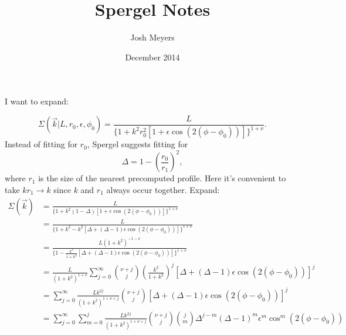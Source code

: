 \documentclass{article}
\title{Spergel Notes}
\author{Josh Meyers}
\date{December 2014}
\begin{document}
I want to expand:

\begin{equation}
  \label{eqn:SBdef}
  \Sigma(\vec{k}|L,r_0,\epsilon,\phi_0) = \frac{L}{\{1+k^2r_0^2[1+\epsilon\cos(2(\phi-\phi_0))]\}^{1+\nu}}.
\end{equation}
Instead of fitting for $r_0$, Spergel suggests fitting for
\begin{equation}
  \Delta = 1 - \left(\frac{r_0}{r_1}\right)^2,
\end{equation}
where $r_1$ is the size of the nearest precomputed profile.  Here it's convenient to take $k r_1 \rightarrow k$ since $k$ and $r_1$ always occur together.
Expand:
\begin{equation}
  \begin{split}
    \Sigma(\vec{k}) & = \frac{L}{\{1+k^2(1-\Delta)[1+\epsilon\cos(2(\phi-\phi_0))]\}^{1+\nu}} \\
    & = \frac{L}{\{1+k^2 - k^2[\Delta + (\Delta-1)\epsilon\cos(2(\phi-\phi_0))]\}^{1+\nu}} \\
    & = \frac{L (1+k^2)^{-1-\nu}}{\{1 - \frac{k^2}{1+k^2}\left[\Delta + (\Delta-1)\epsilon\cos(2(\phi-\phi_0))\right]\}^{1+\nu}} \\
    & = \frac{L}{(1+k^2)^{1+\nu}}\sum_{j=0}^{\infty}\binom{\nu+j}{j}\left(\frac{k^2}{1+k^2}\right)^{j}[\Delta + (\Delta-1)\epsilon\cos(2(\phi-\phi_0))]^j \\
    & = \sum_{j=0}^{\infty}\frac{L k^{2j}}{(1+k^2)^{1+\nu+j}}\binom{\nu+j}{j}[\Delta + (\Delta-1)\epsilon\cos(2(\phi-\phi_0))]^j \\
    & = \sum_{j=0}^{\infty}\sum_{m=0}^{j}\frac{L k^{2j}}{(1+k^2)^{1+\nu+j}}\binom{\nu+j}{j}\binom{j}{m}\Delta^{j-m}(\Delta-1)^m\epsilon^m\cos^m(2(\phi-\phi_0))
  \end{split}
\end{equation}
\end{document}
